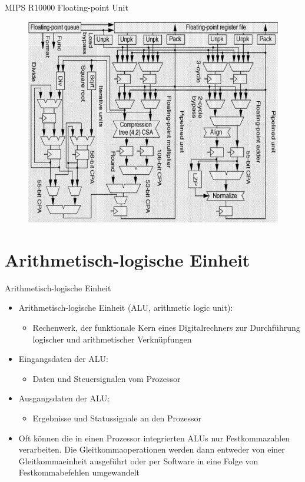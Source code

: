 \documentclass[12pt%
,xcolor=table
,aspectratio=169%
]{beamer}
\begin{document}
\begin{frame}{MIPS R10000 Floating-point Unit}
\begin{figure}
\center
\includegraphics[scale=0.3]{pictures/mips1000_fpu}
\end{figure}
\end{frame}

\section{Arithmetisch-logische Einheit}

\begin{frame}{Arithmetisch-logische Einheit}
\begin{itemize}
	\item Arithmetisch-logische Einheit (ALU, arithmetic logic unit):
	\begin{itemize}
		\item Rechenwerk, der funktionale Kern eines Digitalrechners zur Durchführung logischer und arithmetischer Verknüpfungen
	\end{itemize}
	\item Eingangsdaten der ALU:
	\begin{itemize}
		\item Daten und Steuersignalen vom Prozessor
	\end{itemize}
	\item Ausgangsdaten der ALU:
	\begin{itemize}
		\item Ergebnisse und Statussignale an den Prozessor
	\end{itemize}
	\item Oft können die in einen Prozessor integrierten ALUs nur Festkommazahlen verarbeiten. Die Gleitkommaoperationen werden dann entweder von einer Gleitkommaeinheit ausgeführt oder per Software in eine Folge von Festkommabefehlen umgewandelt
\end{itemize}
\end{frame}
\end{document}
